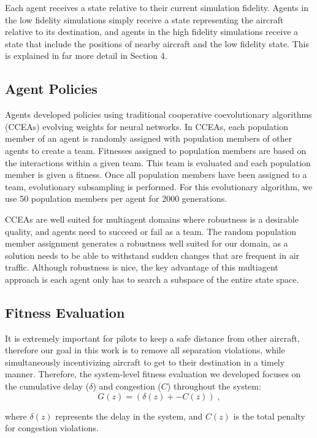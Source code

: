 \documentclass{aamas2014}
\begin{document}
Each agent receives a state relative to their current simulation fidelity. Agents in the low fidelity simulations simply receive a state representing the aircraft relative to its destination, and agents in the high fidelity simulations receive a state that include the positions of nearby aircraft and the low fidelity state. This is explained in far more detail in Section 4. 

\subsection{Agent Policies}
Agents developed policies using traditional cooperative coevolutionary algorithms (CCEAs) evolving weights for neural networks. In CCEAs, each population member of an agent is randomly assigned with population members of other agents to create a team. Fitnesses assigned to population members are based on the interactions within a given team.  This team is evaluated and each population member is given a fitness. Once all population members have been assigned to a team, evolutionary subsampling is performed. For this evolutionary algorithm, we use 50 population members per agent for 2000 generations. 

CCEAs are well suited for multiagent domains where robustness is a desirable quality, and agents need to succeed or fail as a team. The random population member assignment generates a robustness well suited for our domain, as a solution needs to be able to withstand sudden changes that are frequent in air traffic. Although robustness is nice, the key advantage of this multiagent approach is each agent only has to search a subspace of the entire state space. 


\subsection{Fitness Evaluation}
It is extremely important for pilots to keep a safe distance from other aircraft, therefore our goal in this work is to remove all separation violations, while simultaneously incentivizing aircraft to get to their destination in a timely manner. Therefore, the system-level fitness evaluation we developed focuses on the cumulative delay ($\delta$) and congestion ($C$) throughout the system:
%
\begin{equation}
G(z) = (\delta(z) + -C(z))\;,
\end{equation}

where $\delta(z)$ represents the delay in the system, and $C(z)$ is the total penalty for congestion violations.
\end{document}
